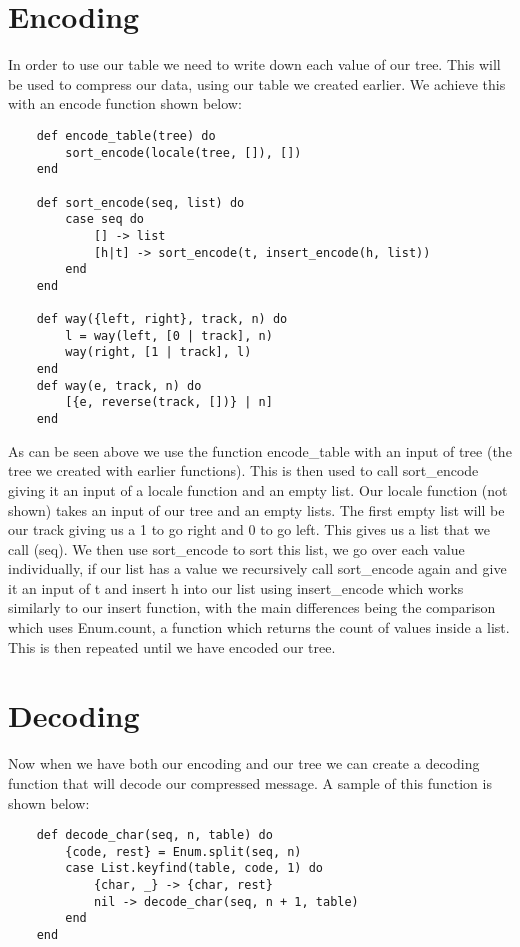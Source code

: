 \documentclass[a4paper,11pt]{article}
\begin{document}
\section*{Encoding}

In order to use our table we need to write down each value of our tree. This will be used to compress our data, using our table we created earlier. We achieve this with an encode function shown below:

\begin{verbatim}
    def encode_table(tree) do
        sort_encode(locale(tree, []), [])
    end

    def sort_encode(seq, list) do
        case seq do
            [] -> list
            [h|t] -> sort_encode(t, insert_encode(h, list))
        end
    end
    
    def way({left, right}, track, n) do
        l = way(left, [0 | track], n)
        way(right, [1 | track], l)
    end
    def way(e, track, n) do
        [{e, reverse(track, [])} | n]
    end

\end{verbatim}

As can be seen above we use the function encode_table with an input of tree (the tree we created with earlier functions). This is then used to call sort_encode giving it an input of a locale function and an empty list. Our locale function (not shown) takes an input of our tree and an empty lists. The first empty list will be our track giving us a 1 to go right and 0 to go left. This gives us a list that we call (seq). We then use sort_encode to sort this list, we go over each value individually, if our list has a value we recursively call sort_encode again and give it an input of t and insert h into our list using insert_encode which works similarly to our insert function, with the main differences being the comparison which uses Enum.count, a function which returns the count of values inside a list. This is then repeated until we have encoded our tree.

\section*{Decoding}

Now when we have both our encoding and our tree we can create a decoding function that will decode our compressed message. A sample of this function is shown below:

\begin{verbatim}
    def decode_char(seq, n, table) do
        {code, rest} = Enum.split(seq, n)
        case List.keyfind(table, code, 1) do
            {char, _} -> {char, rest}
            nil -> decode_char(seq, n + 1, table)
        end
    end
\end{verbatim}
\end{document}
